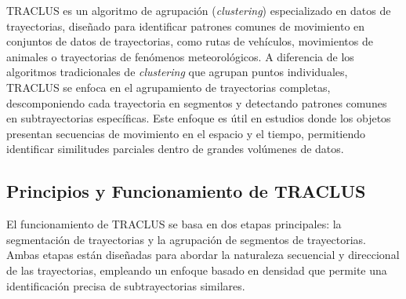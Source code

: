 TRACLUS \cite{lee2007trajectory} es un algoritmo de agrupación (\textit{clustering}) especializado en datos de trayectorias, diseñado para identificar patrones comunes de movimiento en conjuntos de datos de trayectorias, como rutas de vehículos, movimientos de animales o trayectorias de fenómenos meteorológicos. A diferencia de los algoritmos tradicionales de \textit{clustering} que agrupan puntos individuales, TRACLUS se enfoca en el agrupamiento de trayectorias completas, descomponiendo cada trayectoria en segmentos y detectando patrones comunes en subtrayectorias específicas. Este enfoque es útil en estudios donde los objetos presentan secuencias de movimiento en el espacio y el tiempo, permitiendo identificar similitudes parciales dentro de grandes volúmenes de datos.

\subsection*{Principios y Funcionamiento de TRACLUS}

El funcionamiento de TRACLUS se basa en dos etapas principales: la segmentación de trayectorias y la agrupación de segmentos de trayectorias. Ambas etapas están diseñadas para abordar la naturaleza secuencial y direccional de las trayectorias, empleando un enfoque basado en densidad que permite una identificación precisa de subtrayectorias similares.


